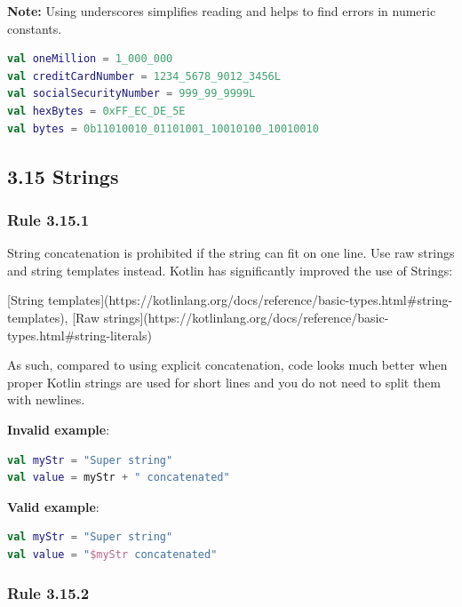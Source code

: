 {{{{\textbf{Note:} Using underscores simplifies reading and helps to find errors in numeric constants.

\begin{lstlisting}[language=Kotlin]
val oneMillion = 1_000_000
val creditCardNumber = 1234_5678_9012_3456L
val socialSecurityNumber = 999_99_9999L
val hexBytes = 0xFF_EC_DE_5E
val bytes = 0b11010010_01101001_10010100_10010010
\end{lstlisting}


\subsection*{\textbf{3.15 Strings}}

\subsubsection*{\textbf{Rule 3.15.1}}
\leavevmode\newline

String concatenation is prohibited if the string can fit on one line. Use raw strings and string templates instead. Kotlin has significantly improved the use of Strings:

[String templates](https://kotlinlang.org/docs/reference/basic-types.html\#string-templates), [Raw strings](https://kotlinlang.org/docs/reference/basic-types.html\#string-literals)

As such, compared to using explicit concatenation, code looks much better when proper Kotlin strings are used for short lines and you do not need to split them with newlines.



\textbf{Invalid example}:

\begin{lstlisting}[language=Kotlin]
val myStr = "Super string"
val value = myStr + " concatenated"
\end{lstlisting}


\textbf{Valid example}:

\begin{lstlisting}[language=Kotlin]
val myStr = "Super string"
val value = "$myStr concatenated"
\end{lstlisting}


\subsubsection*{\textbf{Rule 3.15.2}}
\leavevmode\newline

}}}}
